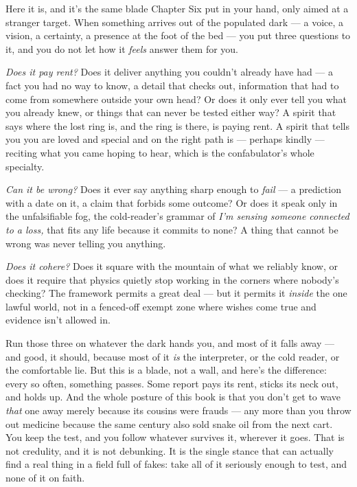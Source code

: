 \documentclass[11pt,openany]{book}
\begin{document}
Here it is, and it’s the same blade Chapter Six put in your hand, only aimed at a stranger target. When something arrives out of the populated dark — a voice, a vision, a certainty, a presence at the foot of the bed — you put three questions to it, and you do not let how it \textit{feels} answer them for you.

\textit{Does it pay rent?} Does it deliver anything you couldn’t already have had — a fact you had no way to know, a detail that checks out, information that had to come from somewhere outside your own head? Or does it only ever tell you what you already knew, or things that can never be tested either way? A spirit that says where the lost ring is, and the ring is there, is paying rent. A spirit that tells you you are loved and special and on the right path is — perhaps kindly — reciting what you came hoping to hear, which is the confabulator’s whole specialty.

\textit{Can it be wrong?} Does it ever say anything sharp enough to \textit{fail} — a prediction with a date on it, a claim that forbids some outcome? Or does it speak only in the unfalsifiable fog, the cold-reader’s grammar of \textit{I’m sensing someone connected to a loss,} that fits any life because it commits to none? A thing that cannot be wrong was never telling you anything.

\textit{Does it cohere?} Does it square with the mountain of what we reliably know, or does it require that physics quietly stop working in the corners where nobody’s checking? The framework permits a great deal — but it permits it \textit{inside} the one lawful world, not in a fenced-off exempt zone where wishes come true and evidence isn’t allowed in.

Run those three on whatever the dark hands you, and most of it falls away — and good, it should, because most of it \textit{is} the interpreter, or the cold reader, or the comfortable lie. But this is a blade, not a wall, and here’s the difference: every so often, something passes. Some report pays its rent, sticks its neck out, and holds up. And the whole posture of this book is that you don’t get to wave \textit{that} one away merely because its cousins were frauds — any more than you throw out medicine because the same century also sold snake oil from the next cart. You keep the test, and you follow whatever survives it, wherever it goes. That is not credulity, and it is not debunking. It is the single stance that can actually find a real thing in a field full of fakes: take all of it seriously enough to test, and none of it on faith.
\end{document}
